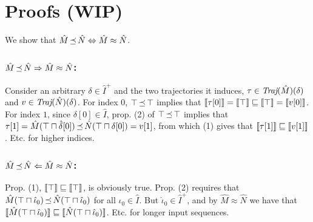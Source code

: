 \section{Proofs (WIP)}

We show that $\hat M \operatorname{\preceq} \hat N \Leftrightarrow \hat M \approx \hat N$.

\subsubsection{$\hat M \operatorname{\preceq} \hat N \Rightarrow \hat M \approx \hat N$:}

Consider an arbitrary $\delta \in \hat I^{+}$ and the two trajectories it induces, $\tau \in \operatorname{\textit{Traj}}(\hat M)(\delta)$ and $v \in \operatorname{\textit{Traj}}(\hat N)(\delta)$. For index $0$, $\top \operatorname{\preceq} \top$ implies that $\llbracket\tau[0]\rrbracket = \llbracket\top\rrbracket \sqsubseteq \llbracket\top\rrbracket = \llbracket v[0]\rrbracket$. For index $1$, since $\delta[0] \in \hat I$, prop. (2) of $\top \operatorname{\preceq} \top$ implies that $\tau[1] = \hat M(\top \sqcap \hat \delta[0]) \operatorname{\preceq} \hat N(\top \sqcap \delta[0]) = v[1]$, from which (1) gives that $\llbracket\tau[1]\rrbracket \sqsubseteq \llbracket v[1]\rrbracket$. Etc. for higher indices.

\subsubsection{$\hat M \operatorname{\preceq} \hat N \Leftarrow \hat M \approx \hat N$:}

Prop. (1), $\llbracket\top\rrbracket \sqsubseteq \llbracket\top\rrbracket$, is obviously true. Prop. (2) requires that $\hat M(\top \sqcap \hat \iota_{0}) \operatorname{\preceq} \hat N(\top \sqcap \hat \iota_{0})$ for all $\hat \iota_{0} \in \hat I$. But $\hat \iota_{0} \in \hat I^{+}$, and by $\hat M \approx \hat N$ we have that $\llbracket\hat M(\top \sqcap \hat \iota_{0})\rrbracket \sqsubseteq \llbracket\hat N(\top \sqcap \hat \iota_{0})\rrbracket$. Etc. for longer input sequences.
